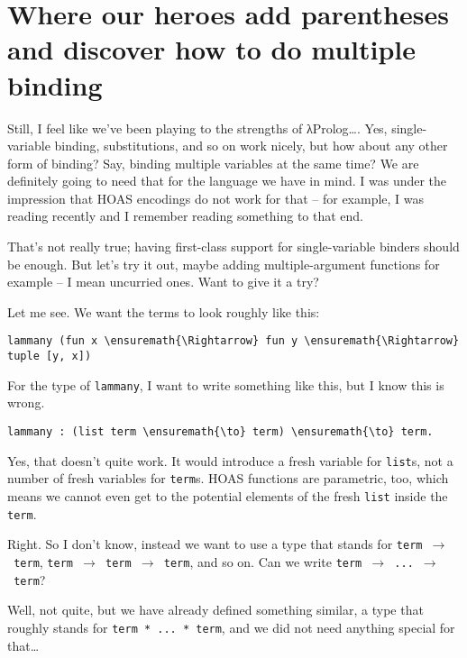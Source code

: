 \section{Where our heroes add parentheses and discover how to do
multiple
binding}\label{where-our-heroes-add-parentheses-and-discover-how-to-do-multiple-binding}

\heroSTUDENT{} Still, I feel like we've been playing to the strengths of
\foreignlanguage{greek}{λ}Prolog\ldots{}. Yes, single-variable binding, substitutions, and so on
work nicely, but how about any other form of binding? Say, binding
multiple variables at the same time? We are definitely going to need
that for the language we have in mind. I was under the impression that
HOAS encodings do not work for that -- for example, I was reading
\citet{keuchel2016needle} recently and I remember reading something to
that end.

\heroADVISOR{} That's not really true; having first-class support for
single-variable binders should be enough. But let's try it out, maybe
adding multiple-argument functions for example -- I mean uncurried ones.
Want to give it a try?

\heroSTUDENT{} Let me see. We want the terms to look roughly like this:

\begin{verbatim}
lammany (fun x \ensuremath{\Rightarrow} fun y \ensuremath{\Rightarrow} tuple [y, x])
\end{verbatim}

For the type of \texttt{lammany}, I want to write something like this,
but I know this is wrong.

\begin{verbatim}
lammany : (list term \ensuremath{\to} term) \ensuremath{\to} term.
\end{verbatim}

\heroADVISOR{} Yes, that doesn't quite work. It would introduce a fresh
variable for \texttt{list}s, not a number of fresh variables for
\texttt{term}s. HOAS functions are parametric, too, which means we
cannot even get to the potential elements of the fresh \texttt{list}
inside the \texttt{term}.

\heroSTUDENT{} Right. So I don't know, instead we want to use a type that
stands for \texttt{term\ \ensuremath{\to}\ term},
\texttt{term\ \ensuremath{\to}\ term\ \ensuremath{\to}\ term}, and so on.
Can we write \texttt{term\ \ensuremath{\to}\ ...\ \ensuremath{\to}\ term}?

\heroADVISOR{} Well, not quite, but we have already defined something similar,
a type that roughly stands for \texttt{term\ *\ ...\ *\ term}, and we
did not need anything special for that\ldots{}


